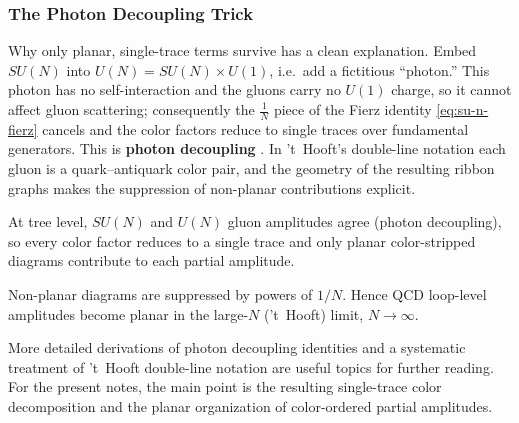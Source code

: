 \subsubsection{The Photon Decoupling Trick}
\label{subsubsec:the-photon-decoupling-trick}

Why only planar, single-trace terms survive has a clean explanation. Embed $SU(N)$ into $U(N) = SU(N)\times U(1)$, i.e.\ add a fictitious ``photon.'' This photon has no self-interaction and the gluons carry no $U(1)$ charge, so it cannot affect gluon scattering; consequently the $\tfrac{1}{N}$ piece of the Fierz identity \eqref{eq:su-n-fierz} cancels and the color factors reduce to single traces over fundamental generators. This is \textbf{photon decoupling} \autocite[\S27.2.1]{schwartzQFT2014}. In 't~Hooft's double-line notation each gluon is a quark--antiquark color pair, and the geometry of the resulting ribbon graphs makes the suppression of non-planar contributions explicit.

\begin{fact}
    At tree level, $SU(N)$ and $U(N)$ gluon amplitudes agree (photon decoupling), so every color factor reduces to a single trace and only planar color-stripped diagrams contribute to each partial amplitude.
\end{fact}

\begin{fact}
    Non-planar diagrams are suppressed by powers of $1/N$. Hence QCD loop-level amplitudes become planar in the large-$N$ ('t~Hooft) limit, $N \to \infty$.
\end{fact}

More detailed derivations of photon decoupling identities and a systematic treatment of 't~Hooft double-line notation are useful topics for further reading. For the present notes, the main point is the resulting single-trace color decomposition and the planar organization of color-ordered partial amplitudes.
